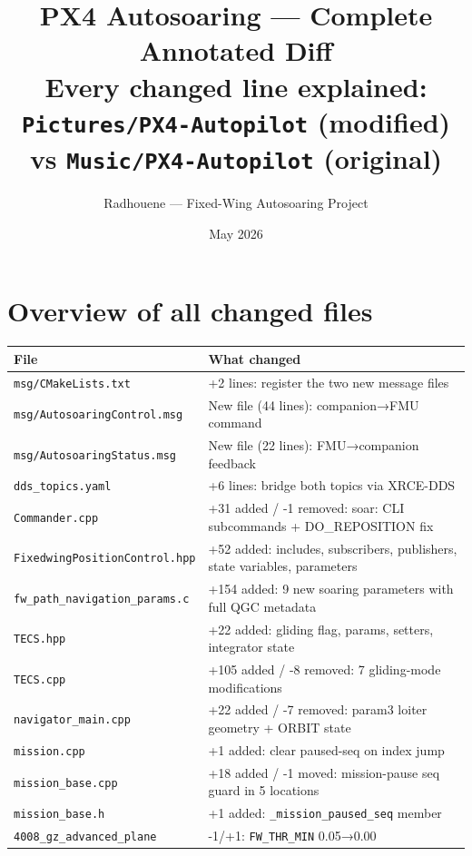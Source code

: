 \documentclass[12pt,a4paper]{article}
\title{\textbf{PX4 Autosoaring --- Complete Annotated Diff}\\
\large Every changed line explained:\\
\texttt{Pictures/PX4-Autopilot} (modified) vs \texttt{Music/PX4-Autopilot} (original)}
\author{Radhouene --- Fixed-Wing Autosoaring Project}
\date{May 2026}
\begin{document}
\maketitle
\tableofcontents
\newpage

\section{Overview of all changed files}

\begin{longtable}{lp{9.5cm}}
\toprule
\textbf{File} & \textbf{What changed} \\
\midrule
\texttt{msg/CMakeLists.txt} & +2 lines: register the two new message files \\
\texttt{msg/AutosoaringControl.msg} & New file (44 lines): companion→FMU command \\
\texttt{msg/AutosoaringStatus.msg} & New file (22 lines): FMU→companion feedback \\
\texttt{dds\_topics.yaml} & +6 lines: bridge both topics via XRCE-DDS \\
\texttt{Commander.cpp} & +31 added / -1 removed: soar: CLI subcommands + DO\_REPOSITION fix \\
\texttt{FixedwingPositionControl.hpp} & +52 added: includes, subscribers, publishers, state variables, parameters \\
\texttt{fw\_path\_navigation\_params.c} & +154 added: 9 new soaring parameters with full QGC metadata \\
\texttt{TECS.hpp} & +22 added: gliding flag, params, setters, integrator state \\
\texttt{TECS.cpp} & +105 added / -8 removed: 7 gliding-mode modifications \\
\texttt{navigator\_main.cpp} & +22 added / -7 removed: param3 loiter geometry + ORBIT state \\
\texttt{mission.cpp} & +1 added: clear paused-seq on index jump \\
\texttt{mission\_base.cpp} & +18 added / -1 moved: mission-pause seq guard in 5 locations \\
\texttt{mission\_base.h} & +1 added: \texttt{\_mission\_paused\_seq} member \\
\texttt{4008\_gz\_advanced\_plane} & -1/+1: \texttt{FW\_THR\_MIN} 0.05→0.00 \\
\bottomrule
\end{longtable}
\end{document}
